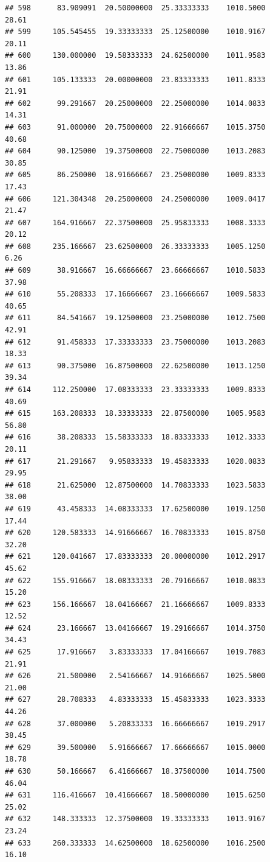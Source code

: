 \documentclass[
]{article}
\begin{document}
\begin{verbatim}
## 598      83.909091  20.50000000  25.33333333    1010.5000       28.61
## 599     105.545455  19.33333333  25.12500000    1010.9167       20.11
## 600     130.000000  19.58333333  24.62500000    1011.9583       13.86
## 601     105.133333  20.00000000  23.83333333    1011.8333       21.91
## 602      99.291667  20.25000000  22.25000000    1014.0833       14.31
## 603      91.000000  20.75000000  22.91666667    1015.3750       40.68
## 604      90.125000  19.37500000  22.75000000    1013.2083       30.85
## 605      86.250000  18.91666667  23.25000000    1009.8333       17.43
## 606     121.304348  20.25000000  24.25000000    1009.0417       21.47
## 607     164.916667  22.37500000  25.95833333    1008.3333       20.12
## 608     235.166667  23.62500000  26.33333333    1005.1250        6.26
## 609      38.916667  16.66666667  23.66666667    1010.5833       37.98
## 610      55.208333  17.16666667  23.16666667    1009.5833       40.65
## 611      84.541667  19.12500000  23.25000000    1012.7500       42.91
## 612      91.458333  17.33333333  23.75000000    1013.2083       18.33
## 613      90.375000  16.87500000  22.62500000    1013.1250       39.34
## 614     112.250000  17.08333333  23.33333333    1009.8333       40.69
## 615     163.208333  18.33333333  22.87500000    1005.9583       56.80
## 616      38.208333  15.58333333  18.83333333    1012.3333       20.11
## 617      21.291667   9.95833333  19.45833333    1020.0833       29.95
## 618      21.625000  12.87500000  14.70833333    1023.5833       38.00
## 619      43.458333  14.08333333  17.62500000    1019.1250       17.44
## 620     120.583333  14.91666667  16.70833333    1015.8750       32.20
## 621     120.041667  17.83333333  20.00000000    1012.2917       45.62
## 622     155.916667  18.08333333  20.79166667    1010.0833       15.20
## 623     156.166667  18.04166667  21.16666667    1009.8333       12.52
## 624      23.166667  13.04166667  19.29166667    1014.3750       34.43
## 625      17.916667   3.83333333  17.04166667    1019.7083       21.91
## 626      21.500000   2.54166667  14.91666667    1025.5000       21.00
## 627      28.708333   4.83333333  15.45833333    1023.3333       44.26
## 628      37.000000   5.20833333  16.66666667    1019.2917       38.45
## 629      39.500000   5.91666667  17.66666667    1015.0000       18.78
## 630      50.166667   6.41666667  18.37500000    1014.7500       46.04
## 631     116.416667  10.41666667  18.50000000    1015.6250       25.02
## 632     148.333333  12.37500000  19.33333333    1013.9167       23.24
## 633     260.333333  14.62500000  18.62500000    1016.2500       16.10

\end{verbatim}
\end{document}
